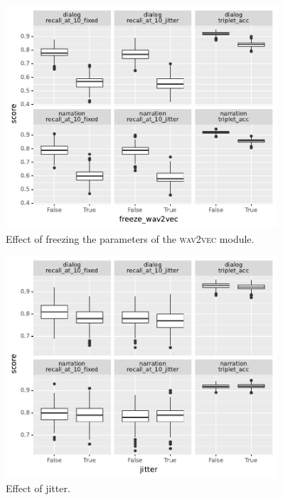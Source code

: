 \begin{figure}[htb]
  \centering
  \includegraphics[width=0.9\textwidth]{results/ablations/freeze_wav2vec.pdf}
  \caption{Effect of freezing the parameters of the \textsc{wav2vec} module.}
  \label{fig:freeze_wav2vec}
\end{figure}


\begin{figure}[htb]
	\centering
	\includegraphics[width=0.9\textwidth]{results/ablations/jitter.pdf}
	\caption{Effect of jitter.}
	\label{fig:jitter}
\end{figure}

